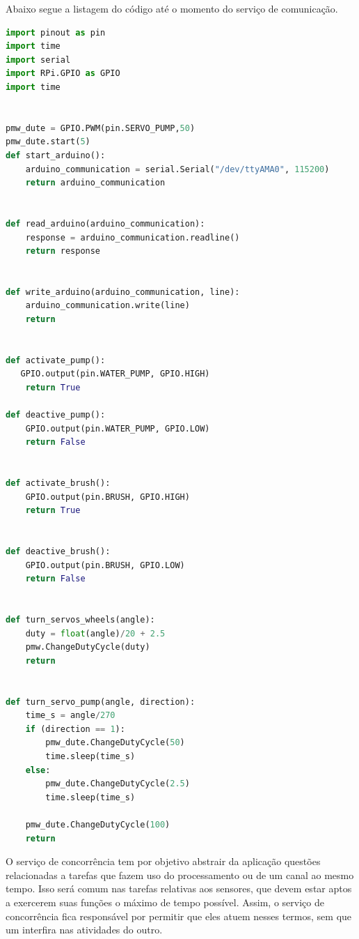 Abaixo segue a listagem do código até o momento do serviço de comunicação.
\begin{lstlisting}[language=Python, label=services, caption=Código da Camada de Serviços - Serviço de Comunicação]
import pinout as pin
import time
import serial
import RPi.GPIO as GPIO
import time 


pmw_dute = GPIO.PWM(pin.SERVO_PUMP,50)
pmw_dute.start(5) 
def start_arduino():
    arduino_communication = serial.Serial("/dev/ttyAMA0", 115200)
    return arduino_communication


def read_arduino(arduino_communication):
    response = arduino_communication.readline()
    return response     


def write_arduino(arduino_communication, line):
    arduino_communication.write(line)
    return


def activate_pump():
   GPIO.output(pin.WATER_PUMP, GPIO.HIGH)
    return True

def deactive_pump():
    GPIO.output(pin.WATER_PUMP, GPIO.LOW)
    return False


def activate_brush():
    GPIO.output(pin.BRUSH, GPIO.HIGH)
    return True


def deactive_brush():
    GPIO.output(pin.BRUSH, GPIO.LOW)
    return False


def turn_servos_wheels(angle):
    duty = float(angle)/20 + 2.5
    pmw.ChangeDutyCycle(duty)      
    return


def turn_servo_pump(angle, direction):
    time_s = angle/270
    if (direction == 1):
        pmw_dute.ChangeDutyCycle(50)
        time.sleep(time_s)  
    else:
        pmw_dute.ChangeDutyCycle(2.5)   
        time.sleep(time_s)

    pmw_dute.ChangeDutyCycle(100) 
    return
\end{lstlisting}

O serviço de concorrência tem por objetivo abstrair da aplicação questões relacionadas a tarefas que fazem uso do processamento ou de um canal ao mesmo tempo. Isso será comum nas tarefas relativas aos sensores, que devem estar aptos a exercerem suas funções o máximo de tempo possível. Assim, o serviço de concorrência fica responsável por permitir que eles atuem nesses termos, sem que um interfira nas atividades do outro.

